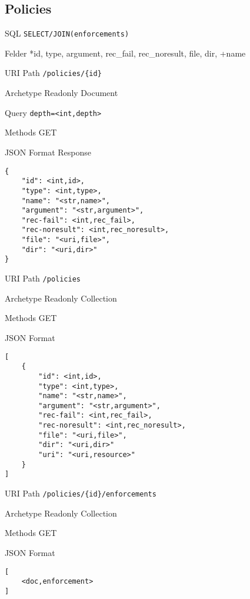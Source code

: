 \documentclass[10pt,a4paper]{scrartcl}
\begin{document}
\pagebreak
\subsection{Policies}

\begin{description*}
	\item[SQL] \texttt{SELECT/JOIN(enforcements)}
	\item[Felder] *id, type, argument, rec\_fail, rec\_noresult, file, dir, +name
\end{description*}

\begin{mdframed}[style=def]
\begin{description*}
	\item[URI Path] \texttt{/policies/\{id\}}
	\item[Archetype] Readonly Document
	\item[Query] \texttt{depth=<int,depth>}
	\item[Methods] GET
	\item[JSON Format Response] \hfill
\begin{lstlisting}
{
	"id": <int,id>,
	"type": <int,type>,
	"name": "<str,name>",
	"argument": "<str,argument>",
	"rec-fail": <int,rec_fail>,
	"rec-noresult": <int,rec_noresult>, 
	"file": "<uri,file>",
	"dir": "<uri,dir>"
}
\end{lstlisting}
\end{description*}
\end{mdframed}

\begin{mdframed}[style=def]
\begin{description*}
	\item[URI Path] \texttt{/policies}
	\item[Archetype] Readonly Collection
	\item[Methods] GET
	\item[JSON Format] \hfill
\begin{lstlisting}
[
	{
		"id": <int,id>,
		"type": <int,type>,
		"name": "<str,name>",
		"argument": "<str,argument>",
		"rec-fail": <int,rec_fail>,
		"rec-noresult": <int,rec_noresult>, 
		"file": "<uri,file>",
		"dir": "<uri,dir>"	
		"uri": "<uri,resource>"
	}
]
\end{lstlisting}
\end{description*}
\end{mdframed}

\begin{mdframed}[style=def]
\begin{description*}
	\item[URI Path] \texttt{/policies/\{id\}/enforcements}
	\item[Archetype] Readonly Collection
	\item[Methods] GET
	\item[JSON Format] \hfill
\begin{lstlisting}
[
	<doc,enforcement>
]
\end{lstlisting}
\end{description*}
\end{mdframed}
\end{document}
